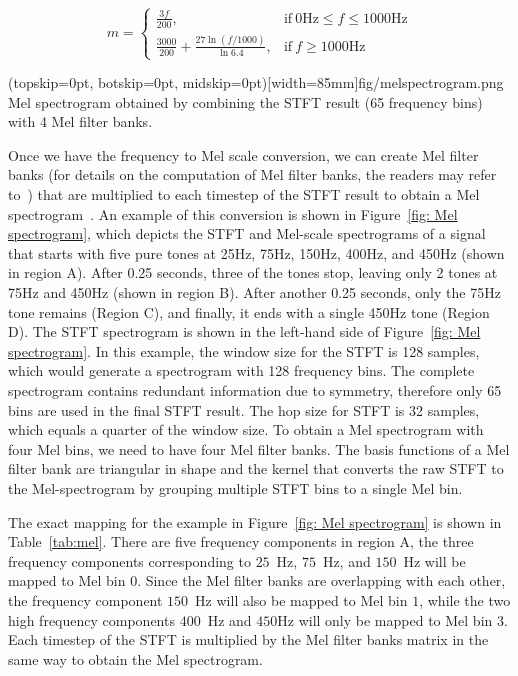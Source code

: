 \documentclass{ieeeaccess}
\begin{document}
\begin{equation}
    m=
    \begin{cases}
      \frac{3f}{200}, & \text{if}\ 0 \text{Hz} \leq f\leq1000 \text{Hz} \\
      \frac{3000}{200} + \frac{27\ln{(f/1000)}}{\ln{6.4}}, & \text{if}\ f \ge 1000\text{Hz}
    \end{cases}
    \label{mel-stanley}
\end{equation}

\Figure[t](topskip=0pt, botskip=0pt, midskip=0pt)[width=85mm]{fig/melspectrogram.png}
{Mel spectrogram obtained by combining the STFT result (65 frequency bins) with 4 Mel filter banks. \label{fig: Mel spectrogram}}


Once we have the frequency to Mel scale conversion, we can create Mel filter banks (for details on the computation of Mel filter banks, the readers may refer to~\cite{Davis1980ComparisonOP}) that are multiplied to each timestep of the STFT result to obtain a Mel spectrogram~\cite{rabiner2011theory}. An example of this conversion is shown in  Figure~\ref{fig: Mel spectrogram}, which depicts the STFT and Mel-scale spectrograms of a signal that starts with five pure tones at 25Hz, 75Hz, 150Hz, 400Hz, and 450Hz (shown in region A). After 0.25 seconds, three of the tones stop, leaving only 2 tones at 75Hz and 450Hz (shown in region B). After another 0.25 seconds, only the 75Hz tone remains (Region C), and finally, it ends with a single 450Hz tone (Region D). The STFT spectrogram is shown in the left-hand side of Figure~\ref{fig: Mel spectrogram}. In this example, the window size for the STFT is 128 samples, which would generate a spectrogram with 128 frequency bins. The complete spectrogram contains redundant information due to symmetry, therefore only 65 bins are used in the final STFT result. The hop size for STFT is 32 samples, which equals a quarter of the window size. To obtain a Mel spectrogram with four Mel bins, we need to have four Mel filter banks. The basis functions of a Mel filter bank are triangular in shape and the kernel that converts the raw STFT to the Mel-spectrogram by grouping multiple STFT bins to a single Mel bin. %

The exact mapping for the example in Figure~\ref{fig: Mel spectrogram} is shown in Table~\ref{tab:mel}. There are five frequency components in region A, the three frequency components corresponding to $25$~Hz, $75$~Hz, and $150$~Hz will be mapped to Mel bin $0$. Since the Mel filter banks are overlapping with each other, the frequency component $150$~Hz will also be mapped to Mel bin $1$, while the two high frequency components $400$~Hz and $450$Hz will only be mapped to Mel bin $3$. Each timestep of the STFT is multiplied by the Mel filter banks matrix in the same way to obtain the Mel spectrogram.
\end{document}
